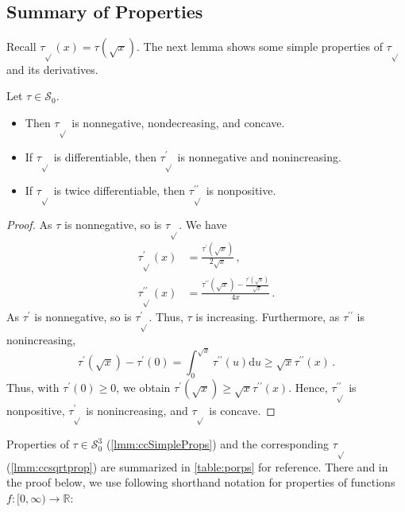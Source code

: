 \documentclass{article}
\newcommand*{\mc}[1]{\mathcal{#1}}
\newcommand{\R}{\mathbb{R}}
\newcommand{\Rp}{[0, \infty)} %
\newcommand{\pr}{^\prime}
\newcommand{\prr}{^{\prime\prime}}
\newcommand{\dl}{\mathrm{d}}
\newcommand{\equationFullstop}{\, .}
\newcommand{\eqfs}{\equationFullstop}
\newcommand{\equationComma}{\, ,}
\newcommand{\eqcm}{\equationComma}
\newcommand{\tran}{\tau}
\newcommand{\trans}{\tran_{\!\sqrt{}}}
\newcommand{\dtrans}{\trans\pr}
\newcommand{\ddtrans}{\trans\prr}
\newcommand{\dtran}{\tran\pr}
\newcommand{\ddtran}{\tran\prr}
\newcommand{\setcco}{\mc S_0}
\newcommand{\setccod}[1]{\mc S_0^{#1}}
\begin{document}
\begin{appendix}
\subsection{Summary of Properties}
%
Recall $\trans(x) = \tran(\sqrt x)$. The next lemma shows some simple properties of $\trans$ and its derivatives.
%
\begin{lemma}\label{lmm:ccsqrtprop}
	Let $\tran\in\setcco$.
	\begin{itemize}
		\item Then $\trans$ is nonnegative, nondecreasing, and concave.
		\item If $\trans$ is differentiable, then $\trans\pr$ is nonnegative and nonincreasing.
		\item If $\trans$ is twice differentiable, then $\trans\prr$ is nonpositive.
	\end{itemize}
\end{lemma}
%
\begin{proof}
	As $\tran$ is nonnegative, so is $\trans$.
	We have 
	\begin{align*}
		\dtrans(x) &= \frac{\dtran(\sqrt{x})}{2 \sqrt{x}}\eqcm\\
		\ddtrans(x) &= \frac{\ddtran(\sqrt{x})-\frac{\dtran(\sqrt{x})}{\sqrt{x}}}{4x}\eqfs
	\end{align*}
	As $\dtran$ is nonnegative, so is $\dtrans$. Thus, $\tran$ is increasing.
	Furthermore, as $\ddtran$ is nonincreasing, 
	\begin{equation}
		\dtran(\sqrt{x}) - \dtran(0) = \int_0^{\sqrt{x}} \ddtran(u) \dl u \geq \sqrt{x} \ddtran(x) \eqfs
	\end{equation}
	Thus, with $\dtran(0) \geq 0$, we obtain  $\dtran(\sqrt{x}) \geq \sqrt{x} \ddtran(x)$. Hence, $\ddtrans$ is nonpositive, $\dtrans$ is nonincreasing, and $\trans$ is concave.
\end{proof}
%
Properties of $\tran\in\setccod3$ (\cref{lmm:ccSimpleProps}) and the corresponding $\trans$ (\cref{lmm:ccsqrtprop}) are summarized in \cref{table:porps} for reference. There and in the proof below, we use following shorthand notation for properties of functions $f \colon \Rp \to \R$:


\end{appendix}
\end{document}

